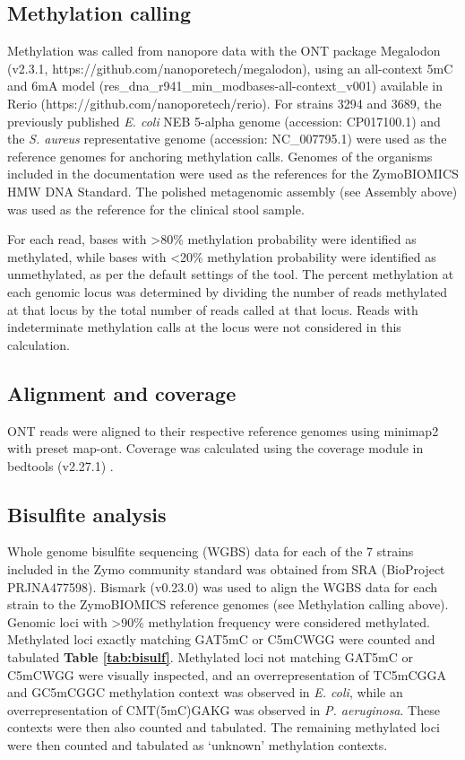 \subsection{Methylation calling}
\label{sec:methods}

Methylation was called from nanopore data with the ONT package Megalodon (v2.3.1, https://github.com/nanoporetech/megalodon), using an all-context 5mC and 6mA model (res\_dna\_r941\_min\_modbases-all-context\_v001) available in Rerio (https://github.com/nanoporetech/rerio). For strains 3294 and 3689, the previously published \textit{E. coli} NEB 5-alpha genome (accession: CP017100.1) and the \textit{S. aureus} representative genome (accession: NC\_007795.1) were used as the reference genomes for anchoring methylation calls. Genomes of the organisms included in the documentation were used as the references for the ZymoBIOMICS HMW DNA Standard. The polished metagenomic assembly (see Assembly above) was used as the reference for the clinical stool sample.

For each read, bases with >80\% methylation probability were identified as methylated, while bases with <20\% methylation probability were identified as unmethylated, as per the default settings of the tool. The percent methylation at each genomic locus was determined by dividing the number of reads methylated at that locus by the total number of reads called at that locus. Reads with indeterminate methylation calls at the locus were not considered in this calculation.

\subsection{Alignment and coverage}
\label{sec:methods}

ONT reads were aligned to their respective reference genomes using minimap2 with preset map-ont. Coverage was calculated using the coverage module in bedtools (v2.27.1) \citep{Quinlan2010-lu}.

\subsection{Bisulfite analysis}
\label{sec:methods}

Whole genome bisulfite sequencing (WGBS) data for each of the 7 strains included in the Zymo community standard was obtained from SRA (BioProject PRJNA477598). Bismark (v0.23.0) \citep{Krueger2011-cu} was used to align the WGBS data for each strain to the ZymoBIOMICS reference genomes (see Methylation calling above). Genomic loci with >90\% methylation frequency were considered methylated. Methylated loci exactly matching GAT5mC or C5mCWGG were counted and tabulated {\bf Table \ref{tab:bisulf}}. Methylated loci not matching GAT5mC or C5mCWGG were visually inspected, and an overrepresentation of TC5mCGGA and GC5mCGGC methylation context was observed in \textit{E. coli}, while an overrepresentation of CMT(5mC)GAKG was observed in \textit{P. aeruginosa}. These contexts were then also counted and tabulated. The remaining methylated loci were then counted and tabulated as ‘unknown’ methylation contexts.

